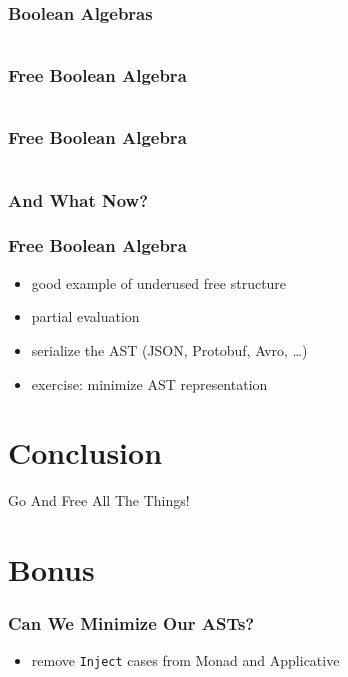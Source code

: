 \documentclass{beamer}
\begin{document}
\begin{frame}
  \frametitle{Boolean Algebras}
  \inputminted{scala}{snippets/boolean-algebra.scala}
\end{frame}

\begin{frame}
  \frametitle{Free Boolean Algebra}
  \inputminted{scala}{snippets/free-bool.scala}
\end{frame}

\begin{frame}
  \frametitle{Free Boolean Algebra}
  \inputminted{scala}{snippets/free-bool-interp.scala}
\end{frame}

\begin{frame}
  \frametitle{And What Now?}
\end{frame}

\begin{frame}
  \frametitle{Free Boolean Algebra}
  \begin{itemize}
  \item good example of underused free structure
  \item partial evaluation
  \item serialize the AST (JSON, Protobuf, Avro, \ldots{})
  \item exercise: minimize AST representation
  \end{itemize}
\end{frame}

\section{Conclusion}\label{sec:conclusion}

\begin{frame}
  \begin{center}
    \Huge
    Go And Free All The Things!
  \end{center}
\end{frame}

\begin{frame}
  \tableofcontents{}
\end{frame}

\appendix{}

\section*{Bonus}\label{sec:bonus}

\begin{frame}
  \frametitle{Can We Minimize Our ASTs?}
  \begin{itemize}
  \item remove \texttt{Inject} cases from Monad and Applicative
  \end{itemize}
\end{frame}
\end{document}
